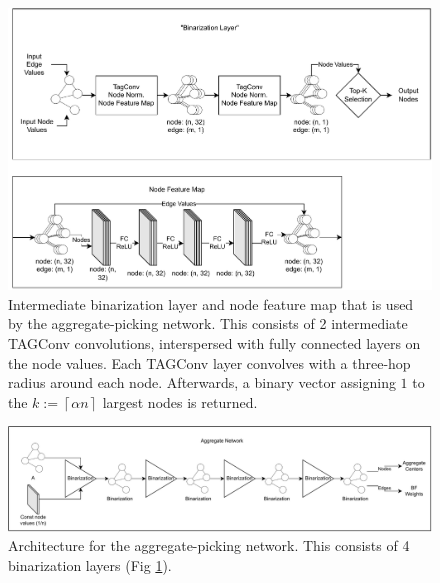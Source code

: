 \documentclass{article}
\newcommand{\ceil}[1]{\left\lceil #1 \right\rceil}
\begin{document}
\begin{figure}[h]
  \centering
  \includegraphics[width=\textwidth]{binarization.pdf}
  \caption{Intermediate binarization layer and node feature map that is used by the aggregate-picking network.  This consists of 2 intermediate TAGConv convolutions, interspersed with fully connected layers on the node values.  Each TAGConv layer convolves with a three-hop radius around each node.  Afterwards, a binary vector assigning $1$ to the $k:=\ceil{\alpha n}$ largest nodes is returned.}
  \label{fig:arch_bin}
\end{figure}

\begin{figure}[h]
  \centering
  \includegraphics[width=\textwidth]{aggregate.pdf}
  \caption{Architecture for the aggregate-picking network.  This consists of 4 binarization layers (Fig \ref{fig:arch_bin}).}
  \label{fig:arch_agg}
\end{figure}
\end{document}
